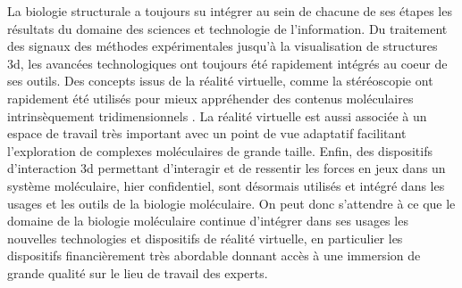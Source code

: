 

La biologie structurale a toujours su intégrer au sein de chacune de ses étapes les résultats du domaine des sciences et technologie de l'information. Du traitement des signaux des méthodes expérimentales jusqu'à la visualisation de structures 3d, les avancées technologiques ont toujours été rapidement intégrés au coeur de ses outils. Des concepts issus de la réalité virtuelle, comme la stéréoscopie ont rapidement été utilisés pour mieux appréhender des contenus moléculaires intrinsèquement tridimensionnels \cite{van2000immersive,stone_immersive_2010,odonoghue_visualization_2010}. La réalité virtuelle est aussi associée à un espace de travail très important avec un point de vue adaptatif facilitant l'exploration de complexes moléculaires de grande taille. Enfin, des dispositifs d'interaction 3d permettant d'interagir et de ressentir les forces en jeux dans un système moléculaire, hier confidentiel, sont désormais utilisés et intégré dans les usages et les outils de la biologie moléculaire. On peut donc s'attendre à ce que le domaine de la biologie moléculaire continue d'intégrer dans ses usages les nouvelles technologies et dispositifs de réalité virtuelle, en particulier les dispositifs financièrement très abordable donnant accès à une immersion de grande qualité sur le lieu de travail des experts.


